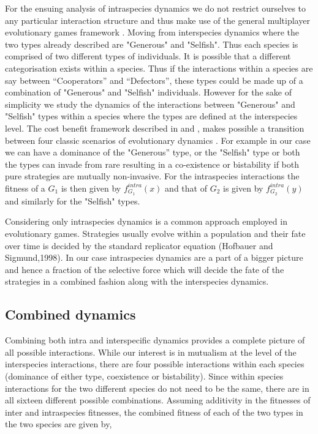 \documentclass[12pt]{article}
\begin{document}
For the ensuing analysis of intraspecies dynamics we do not restrict ourselves to any particular interaction structure and thus make use of the general multiplayer evolutionary games framework \citep{gokhale:PNAS:2010,gokhale:DGAA:2014}. Moving from interspecies dynamics where the two types already described are "Generous" and "Selfish". Thus each species is comprised of two different types of individuals. It is possible that a different categorisation exists within a species. Thus if the interactions within a species are say between “Cooperators” and “Defectors”, these types could be made up of a combination of "Generous" and "Selfish" individuals. However for the sake of simplicity we study the dynamics of the interactions between "Generous" and "Selfish" types within a species where the types are defined at the interspecies level. The cost benefit framework described in \cite{eshel:AmNat:1988} and \cite{hauert:JTB:2006a}, makes possible a transition between four classic scenarios of evolutionary dynamics \citep{nowak:Science:2004}. 
For example in our case we can have a dominance of the "Generous” type, or the "Selfish" type or both the types can invade from rare resulting in a co-existence or bistability if both pure strategies are mutually non-invasive. For the intraspecies interactions the fitness of a $G_1$ is then given by $f^{intra}_{G_1} (x)$ and that of $G_2$ is given by $f^{intra}_{G_2} (y)$ and similarly for the "Selfish" types.

Considering only intraspecies dynamics is a common approach employed in evolutionary games. Strategies usually evolve within a population and their fate over time is decided by the standard replicator equation (Hofbauer and Sigmund,1998). In our  case intraspecies dynamics are a part of a bigger picture and hence a fraction of the selective force which will decide the fate of the strategies in a combined fashion along with the interspecies dynamics.

\subsection{Combined dynamics}

Combining both intra and interspecific dynamics provides a complete picture of all possible interactions. While our interest is in mutualism at the level of the interspecies interactions, there are four possible interactions within each species \citep{nowak:Science:2004,hauert:JTB:2006a} (dominance of either type, coexistence or bistability). Since within species interactions for the two different species do not need to be the same, there are in all sixteen different possible combinations. Assuming additivity in the fitnesses of inter and intraspecies fitnesses, the combined fitness of each of the two types in the two species are given by,
\end{document}
